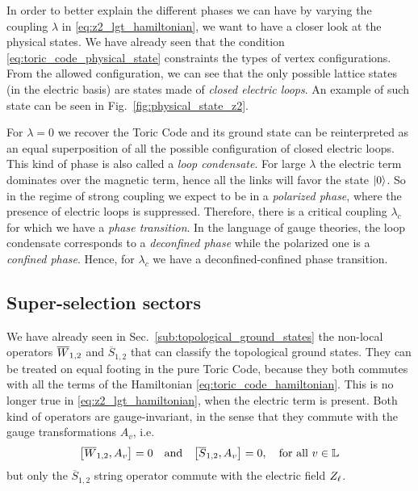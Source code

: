 In order to better explain the different phases we can have by varying the coupling $\lambda$ in \eqref{eq:z2_lgt_hamiltonian}, we want to have a closer look at the physical states.
We have already seen that the condition \eqref{eq:toric_code_physical_state} constraints the types of vertex configurations.
From the allowed configuration, we can see that the only possible lattice states (in the electric basis) are states made of \emph{closed electric loops}.
An example of such state can be seen in Fig.~\ref{fig:physical_state_z2}.


\begin{figure}[t]
\end{figure}


For $\lambda = 0$ we recover the Toric Code and its ground state can be reinterpreted as an equal superposition of all the possible configuration of closed electric loops.
This kind of phase is also called a \emph{loop condensate}.
For large $\lambda$ the electric term dominates over the magnetic term, hence all the links will favor the state $\ket{0}$.
So in the regime of strong coupling we expect to be in a \emph{polarized phase}, where the presence of electric loops is suppressed.
Therefore, there is a critical coupling $\lambda_c$ for which we have a \emph{phase transition}.
In the language of gauge theories, the loop condensate corresponds to a \emph{deconfined phase} while the polarized one is a \emph{confined phase}.
Hence, for $\lambda_c$ we have a deconfined-confined phase transition.


\subsection{Super-selection sectors}
\label{sub:super_selection_sectors}

We have already seen in Sec.~\ref{sub:topological_ground_states} the non-local operators $\overline{W}_{1,2}$ and $\overline{S}_{1,2}$ that can classify the topological ground states.
They can be treated on equal footing in the pure Toric Code, because they both commutes with all the terms of the Hamiltonian \eqref{eq:toric_code_hamiltonian}.
This is no longer true in \eqref{eq:z2_lgt_hamiltonian}, when the electric term is present.
Both kind of operators are gauge-invariant, in the sense that they commute with the gauge transformations $A_v$, i.e.
\begin{equation}
    \comm{\Wilson_{1,2}}{A_v} = 0
    \qand
    \comm{\overline{S}_{1,2}}{A_v} = 0,
    \quad \text{for all $v \in \lattice$}
\end{equation}
but only the $\overline{S}_{1,2}$ string operator commute with the electric field $Z_{\ell}$.

